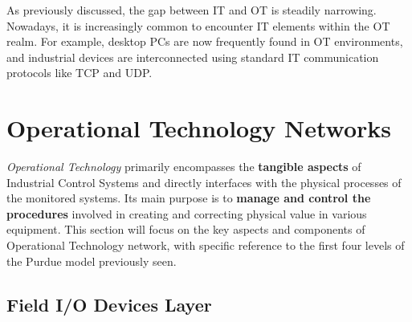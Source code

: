 As previously discussed, the gap between IT and OT is steadily narrowing. Nowadays, it is increasingly common to encounter IT elements within the OT realm. For example, desktop PCs are now frequently found in OT environments, and industrial devices are interconnected using standard IT communication protocols like TCP and UDP.

\section{Operational Technology Networks}
\label{subsec:2_ot_network}

\textit{Operational Technology} primarily encompasses the \textbf{tangible aspects} of Industrial Control Systems and directly interfaces with the physical processes of the monitored systems. Its main purpose is to \textbf{manage and control the procedures} involved in creating and correcting physical value in various equipment.\newline
This section will focus on the key aspects and components of Operational Technology network, with specific reference to the first four levels of the Purdue model previously seen.




\subsection{Field I/O Devices Layer}
\label{subsec:2_ot_field_io_devs}

